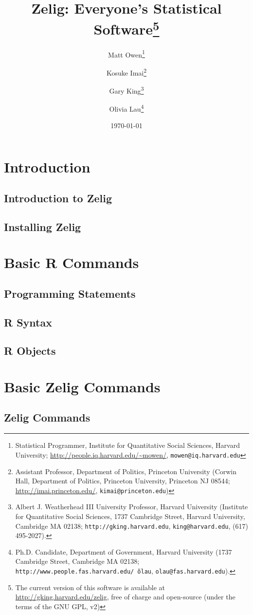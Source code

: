 \documentclass{book}
\title{
  Zelig: Everyone's Statistical Software\thanks{The current version of
  this software is available at 
  \url{http://gking.harvard.edu/zelig}, free of charge and open-source
  (under the terms of the GNU GPL, v2)}
}
\author{
  Matt Owen\thanks{Statistical Programmer, Institute for Quantitative Social
  Sciences, Harvard University; \url{http://people.iq.harvard.edu/\~mowen/},
  \texttt{mowen@iq.harvard.edu}}
  \and
  Kosuke Imai\thanks{Assistant Professor, Department of Politics,
  Princeton University
  (Corwin Hall, Department of Politics, Princeton University, Princeton NJ 08544;
  \url{http://imai.princeton.edu/}, \texttt{kimai@princeton.edu})}
  \and
  Gary King\thanks{Albert J. Weatherhead III University Professor, Harvard
  University (Institute for Quantitative Social Sciences, 1737 Cambridge 
  Street, Harvard University, Cambridge MA 02138;
  \texttt{http://gking.harvard.edu}, \texttt{king@harvard.edu},
  (617) 495-2027).}
  \and
  Olivia Lau\thanks{Ph.D. Candidate, Department of Government, Harvard
  University (1737 Cambridge Street, Cambridge MA 02138;
  \texttt{http://www.people.fas.harvard.edu/\~\,olau},
  \texttt{olau@fas.harvard.edu}).}
}
\date{\today
}
\begin{document}
\maketitle
\tableofcontents

\part{Introduction}
\label{part:Introduction}

\chapter[Introduction]{Introduction to Zelig}
\label{chapter:Intro}


\chapter[Installing Zelig]{Installing Zelig}
\label{chapter:Install}


\part{Basic R Commands}
\label{part:Basic R Commands}

\chapter[Programming Statements]{Programming Statements}
\label{chapter:Programmingstatements}


\chapter[R Syntax]{R Syntax}
\label{chapter:Syntax}


\chapter[R Objects]{R Objects}
\label{chapter:Robjects}


\part{Basic Zelig Commands}
\label{part:R Basics}

\chapter[Zelig Commands]{Zelig Commands}
\label{chapter:Zcommands}

\end{document}
